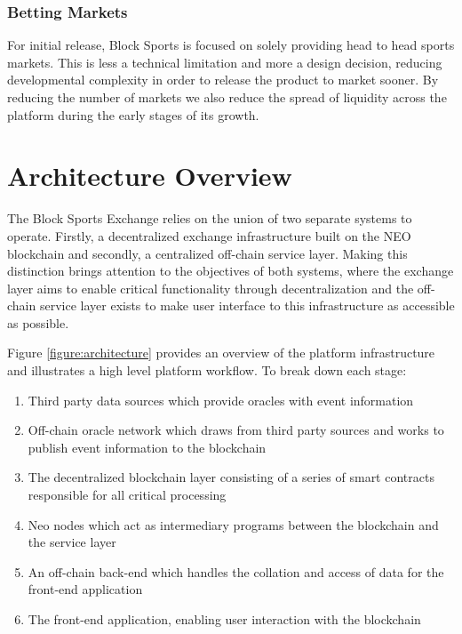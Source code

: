 \documentclass{article}
\begin{document}
		\subsubsection{Betting Markets}
For initial release, Block Sports is focused on solely providing head to head sports markets. This is less a technical limitation and more a design decision, reducing developmental complexity in order to release the product to market sooner. By reducing the number of markets we also reduce the spread of liquidity across the platform during the early stages of its growth.

\section{Architecture Overview}
The Block Sports Exchange relies on the union of two separate systems to operate. Firstly, a decentralized exchange infrastructure built on the NEO blockchain and secondly, a centralized  off-chain service layer. Making this distinction brings attention to the objectives of both systems, where the exchange layer aims to enable critical functionality through decentralization and the off-chain service layer exists to make user interface to this infrastructure as accessible as possible.

Figure \ref{figure:architecture} provides an overview of the platform infrastructure and illustrates a high level platform workflow. To break down each stage:
\begin{enumerate}[label=(\alph*)]
	\item Third party data sources which provide oracles with event information
	\item Off-chain oracle network which draws from third party sources and works to publish event information to the blockchain
	\item The decentralized blockchain layer consisting of a series of smart contracts responsible for all critical processing
	\item Neo nodes which act as intermediary programs between the blockchain and the service layer
	\item An off-chain back-end which handles the collation and access of data for the front-end application
	\item The front-end application, enabling user interaction with the blockchain
\end{enumerate}
\end{document}
